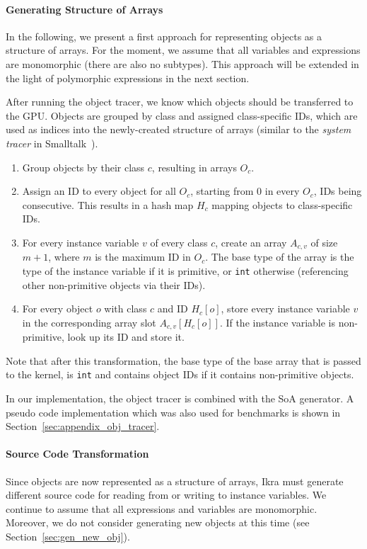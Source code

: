 \documentclass[preprint]{sigplanconf}
\begin{document}
\paragraph{Generating Structure of Arrays}
In the following, we present a first approach for representing objects as a structure of arrays. For the moment, we assume that all variables and expressions are monomorphic (there are also no subtypes). This approach will be extended in the light of polymorphic expressions in the next section.

After running the object tracer, we know which objects should be transferred to the GPU. Objects are grouped by class and assigned class-specific IDs, which are used as indices into the newly-created structure of arrays (similar to the \emph{system tracer} in Smalltalk~\cite{Krasner:1983:SBH:226}).

\begin{enumerate}
    \item Group objects by their class $c$, resulting in arrays $O_c$.
    \item Assign an ID to every object for all $O_c$, starting from $0$ in every $O_c$, IDs being consecutive. This results in a hash map $H_c$ mapping objects to class-specific IDs.
    \item For every instance variable $v$ of every class $c$, create an array $A_{c,v}$ of size $m + 1$, where $m$ is the maximum ID in $O_c$. The base type of the array is the type of the instance variable if it is primitive, or \texttt{int} otherwise (referencing other non-primitive objects via their IDs).
    \item For every object $o$ with class $c$ and ID $H_c[o]$, store every instance variable $v$ in the corresponding array slot $A_{c, v}[H_c[o]]$. If the instance variable is non-primitive, look up its ID and store it.
\end{enumerate}

Note that after this transformation, the base type of the base array that is passed to the kernel, is \texttt{int} and contains object IDs if it contains non-primitive objects.

In our implementation, the object tracer is combined with the SoA generator. A pseudo code implementation which was also used for benchmarks is shown in Section~\ref{sec:appendix_obj_tracer}.

\paragraph{Source Code Transformation}
Since objects are now represented as a structure of arrays, Ikra must generate different source code for reading from or writing to instance variables. We continue to assume that all expressions and variables are monomorphic. Moreover, we do not consider generating new objects at this time (see Section~\ref{sec:gen_new_obj}).
\end{document}
